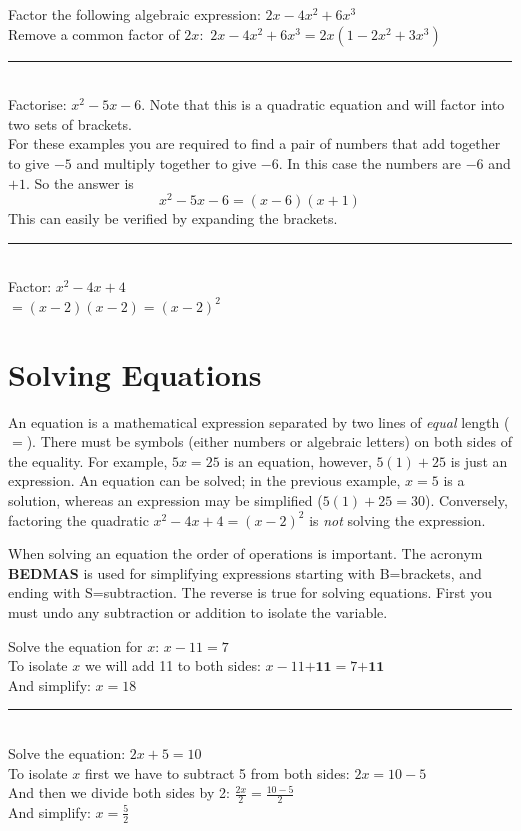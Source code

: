 \example Factor the following algebraic expression: $2x-4x^2+6x^3$\medskip\\
\solution Remove a common factor of $2x$: $\,2x-4x^2+6x^3=2x(1-2x^2+3x^3)$\\
\rule{6.8cm}{0.5pt}\\
\example Factorise: $x^{2} -5 x -6$. Note that this is a quadratic equation and will factor into two sets of brackets.\\
\solution For these examples you are required to find a pair of numbers that add together to give $ -5$ and multiply together to give $ -6$. In this case the numbers are $ -6$ and $ +1$. So the answer is
\begin{equation*}x^{2} -5 x -6 =\left (x -6\right ) \left (x +1\right )
\end{equation*}
This can easily be verified by expanding the brackets.\\
\rule{6.8cm}{0.5pt}\\
\example Factor: $x^2-4x+4$\medskip\\
\solution $=(x-2)(x-2)=(x-2)^2$

\section*{Solving Equations}
An equation is a mathematical expression separated by two lines of \textit{equal} length ($=$). There must be symbols (either numbers or algebraic letters) on both sides of the equality. For example, $5x=25$ is an equation, however, $5(1)+25$ is just an expression. An equation can be solved; in the previous example, $x=5$ is a solution, whereas an expression may be simplified ($5(1)+25=30$). Conversely, factoring the quadratic $x^2-4x+4=(x-2)^2$ is \textit{not} solving the expression.

When solving an equation the order of operations is important. The acronym \textbf{BEDMAS} is used for simplifying expressions starting with B=brackets, and ending with S=subtraction. The reverse is true for solving equations. First you must undo any subtraction or addition to isolate the variable.

\example Solve the equation for $x$: $x-11=7$\medskip\\
\solution To isolate $x$ we will add 11 to both sides: $x-11\textbf{+11}=7\textbf{+11}$\\
And simplify: $x=18$\\
\rule{6.8cm}{0.5pt}\\
\example Solve the equation: $2x+5=10$\medskip\\
\solution To isolate $x$ first we have to subtract 5 from both sides: $2x=10-5$\\
And then we divide both sides by 2: $\frac{2x}{2}=\frac{10-5}{2}$\\
And simplify: $x=\frac{5}{2}$

